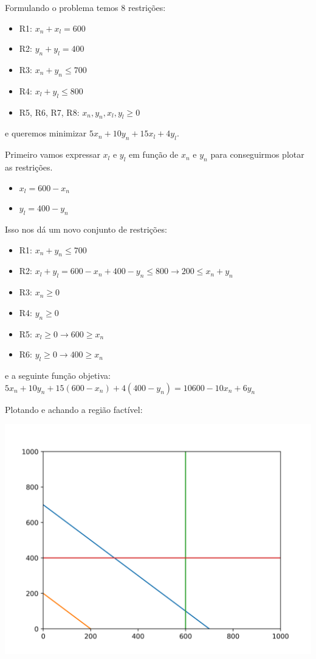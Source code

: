 \documentclass[11pt]{article}
\begin{document}
Formulando o problema temos 8 restrições:
\begin{itemize}
\item R1: \(x_n+x_l = 600\)
\item R2: \(y_n+y_l = 400\)
\item R3: \(x_n+y_n \leq 700\)
\item R4: \(x_l+y_l \leq 800\)
\item R5, R6, R7, R8: \(x_n,y_n,x_l,y_l \geq 0\)
\end{itemize}

e queremos minimizar \(5x_n+10y_n+15x_l+4y_l\).

Primeiro vamos expressar \(x_l\) e \(y_l\) em função de \(x_n\) e \(y_n\) para conseguirmos plotar as restrições.

\begin{itemize}
\item \(x_l = 600-x_n\)
\item \(y_l = 400-y_n\)
\end{itemize}

Isso nos dá um novo conjunto de restrições:
\begin{itemize}
\item R1: \(x_n+y_n \leq 700\)
\item R2: \(x_l+y_l = 600-x_n+400-y_n \leq 800 \rightarrow 200 \leq x_n+y_n\)
\item R3: \(x_n \geq 0\)
\item R4: \(y_n \geq 0\)
\item R5: \(x_l \geq 0 \rightarrow 600 \geq x_n\)
\item R6: \(y_l \geq 0 \rightarrow 400 \geq x_n\)
\end{itemize}

e a seguinte função objetiva: \(5x_n+10y_n+15(600-x_n)+4(400-y_n) = 10600 - 10x_n + 6y_n\)

Plotando e achando a região factível:

\begin{center}
\includegraphics[width=.9\linewidth]{q7.png}
\end{center}
\end{document}
